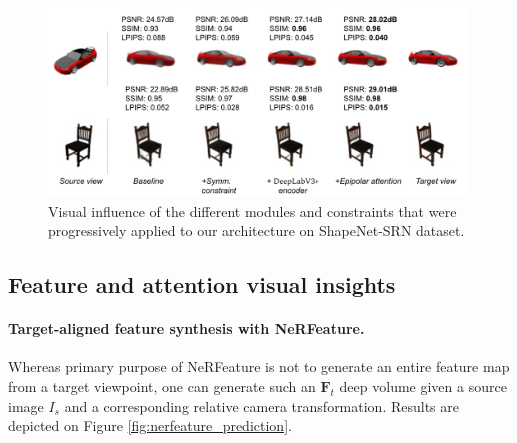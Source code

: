 \begin{figure}[htp!]
    \center
  \includegraphics[height=5cm]{images/epinerf/ablation-srn.png}
  \caption{Visual influence of the different modules and constraints that were progressively applied to our architecture on ShapeNet-SRN dataset.}
  \label{fig:ablation}
\end{figure}


\subsection{Feature and attention visual insights}
\label{subsec:visual_insights}


\paragraph{Target-aligned feature synthesis with NeRFeature.} 
Whereas primary purpose of NeRFeature is not to generate an entire feature map from a target viewpoint, one can generate such an $\mathbf{F}_{t}$ deep volume given a source image $I_{s}$ and a corresponding relative camera transformation. Results are depicted on Figure \ref{fig:nerfeature_prediction}. 

